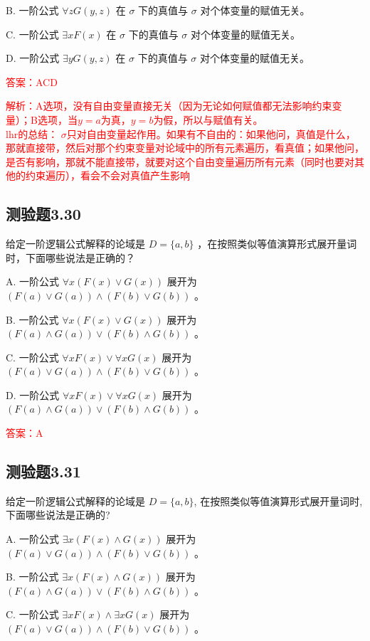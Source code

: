 \documentclass[UTF8, heading=true]{ctexart}
\begin{document}
B. 
一阶公式 $\forall z G(y, z)$ 在 $\sigma$ 下的真值与 $\sigma$ 对个体变量的赋值无关。

C. 
一阶公式 $\exists x F(x)$ 在 $\sigma$ 下的真值与 $\sigma$ 对个体变量的赋值无关。

D. 
一阶公式 $\exists y G(y, z)$ 在 $\sigma$ 下的真值与 $\sigma$ 对个体变量的赋值无关。

\textcolor{red}{答案：ACD}

\textcolor{red}{解析：A选项，没有自由变量直接无关（因为无论如何赋值都无法影响约束变量）；B选项，当$y=a$为真，$y=b$为假，所以与赋值有关。\\ \indent lhr的总结：
$\sigma$只对自由变量起作用。如果有不自由的：如果他问，真值是什么，那就直接带，然后对那个约束变量对论域中的所有元素遍历，看真值；如果他问，是否有影响，那就不能直接带，就要对这个自由变量遍历所有元素（同时也要对其他的约束遍历），看会不会对真值产生影响}

\subsection{测验题3.30}

给定一阶逻辑公式解释的论域是 $D=\{a, b\}$ ，在按照类似等值演算形式展开量词时，下面哪些说法是正确的？

A. 一阶公式 $\forall x(F(x) \vee G(x))$ 展开为 $(F(a) \vee G(a)) \wedge(F(b) \vee G(b))$ 。

B. 一阶公式 $\forall x(F(x) \vee G(x))$ 展开为 $(F(a) \wedge G(a)) \vee(F(b) \wedge G(b))$ 。

C. 一阶公式 $\forall x F(x) \vee \forall x G(x)$ 展开为 $(F(a) \vee G(a)) \wedge(F(b) \vee G(b))$ 。

D. 一阶公式 $\forall x F(x) \vee \forall x G(x)$ 展开为 $(F(a) \wedge G(a)) \vee(F(b) \wedge G(b))$ 。

\textcolor{red}{答案：A}

\subsection{测验题3.31}

给定一阶逻辑公式解释的论域是 $D=\{a, b\}$, 在按照类似等值演算形式展开量词时, 下面哪些说法是正确的?

A. 一阶公式 $\exists x(F(x) \wedge G(x))$ 展开为 $(F(a) \vee G(a)) \wedge(F(b) \vee G(b))$ 。

B. 一阶公式 $\exists x(F(x) \wedge G(x))$ 展开为 $(F(a) \wedge G(a)) \vee(F(b) \wedge G(b))$ 。

C. 一阶公式 $\exists x F(x) \wedge \exists x G(x)$ 展开为 $(F(a) \vee G(a)) \wedge(F(b) \vee G(b))$ 。
\end{document}
